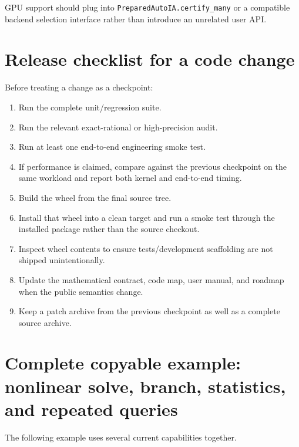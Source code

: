 \documentclass[11pt]{article}
\begin{document}
GPU support should plug into \texttt{PreparedAutoIA.certify\_many} or a compatible
backend selection interface rather than introduce an unrelated user API.

\section{Release checklist for a code change}

Before treating a change as a checkpoint:
\begin{enumerate}[leftmargin=*]
\item Run the complete unit/regression suite.
\item Run the relevant exact-rational or high-precision audit.
\item Run at least one end-to-end engineering smoke test.
\item If performance is claimed, compare against the previous checkpoint on the
same workload and report both kernel and end-to-end timing.
\item Build the wheel from the final source tree.
\item Install that wheel into a clean target and run a smoke test through the
installed package rather than the source checkout.
\item Inspect wheel contents to ensure tests/development scaffolding are not
shipped unintentionally.
\item Update the mathematical contract, code map, user manual, and roadmap when
the public semantics change.
\item Keep a patch archive from the previous checkpoint as well as a complete
source archive.
\end{enumerate}

\section{Complete copyable example: nonlinear solve, branch, statistics, and repeated queries}

The following example uses several current capabilities together.
\end{document}
